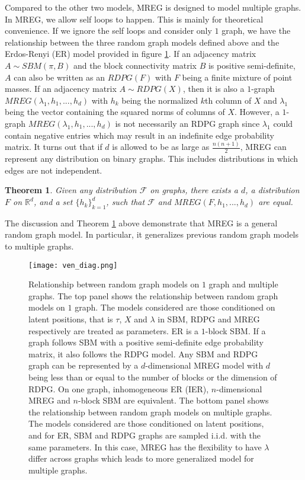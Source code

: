 \documentclass[10pt,journal,compsoc]{IEEEtran}
\newtheorem{theorem}{Theorem}[section]
\begin{document}
\noindent Compared to the other two models, MREG is designed to model multiple graphs. In MREG, we allow self loops to happen. This is mainly for theoretical convenience. If we ignore the self loops and consider only $1$ graph, we have the relationship between the three random graph models defined above and the Erdos-Renyi (ER) model provided in figure \ref{fig:ven}. If an adjacency matrix $A \sim SBM(\pi,B)$ and the block connectivity matrix $B$ is positive semi-definite, $A$ can also be written as an $RDPG(F)$ with $F$ being a finite mixture of point masses. If an adjacency matrix $A \sim RDPG(X)$, then it is also a $1$-graph $MREG(\lambda_1,h_1,...,h_d)$ with $h_k$ being the normalized $k$th column of $X$ and $\lambda_1$ being the vector containing the squared norms of columns of $X$. However, a $1$-graph $MREG(\lambda_1,h_1,...,h_d)$ is not necessarily an RDPG graph since $\lambda_1$ could contain negative entries which may result in an indefinite edge probability matrix. It turns out that if $d$ is allowed to be as large as $\frac{n(n+1)}{2}$, MREG can represent any distribution on binary graphs. This includes distributions in which edges are not independent.   
\begin{theorem}
	Given any distribution $\mathcal{F}$ on graphs, there exists a $d$, a distribution $F$ on $\mathbb{R}^d$, and a set $\{h_k\}_{k=1}^d$, such that $\mathcal{F}$ and $MREG(F,h_1,...,h_d)$ are equal.
	\label{thm:rep}
\end{theorem}
The discussion and Theorem \ref{thm:rep} above demonstrate that MREG is a general random graph model. In particular, it generalizes previous random graph models to multiple graphs. 

\begin{figure}[!htbp]
	\centering
	\texttt{[image: ven\_diag.png]}
	\caption{Relationship between random graph models on $1$ graph and multiple graphs. The top panel shows the relationship between random graph models on $1$ graph. The models considered are those conditioned on latent positions, that is $\tau$, $X$ and $\lambda$ in SBM, RDPG and MREG respectively are treated as parameters. ER is a $1$-block SBM. If a graph follows SBM with a positive semi-definite edge probability matrix, it also follows the RDPG model. Any  SBM and  RDPG graph can be represented by a $d$-dimensional MREG model with $d$ being less than or equal to the number of blocks or the dimension of RDPG. On one graph, inhomogeneous ER (IER), $n$-dimensional MREG and $n$-block SBM are equivalent. The bottom panel shows the relationship between random graph models on multiple graphs. The models considered are those conditioned on latent positions, and for ER, SBM and RDPG graphs are sampled i.i.d. with the same parameters. In this case, MREG has the flexibility to have $\lambda$ differ across graphs which leads to more generalized model for multiple graphs.}
	\label{fig:ven}
\end{figure}
\end{document}
